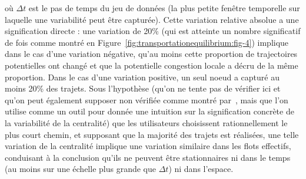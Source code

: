 {où $\Delta t$ est le pas de temps du jeu de données (la plus petite fenêtre temporelle sur laquelle une variabilité peut être capturée). Cette variation relative absolue a une signification directe : une variation de 20\% (qui est atteinte un nombre significatif de fois comme montré en Figure~\ref{fig:transportationequilibrium:fig-4}) implique dans le cas d'une variation négative, qu'au moins cette proportion de trajectoires potentielles ont changé et que la potentielle congestion locale a décru de la même proportion. Dans le cas d'une variation positive, un seul noeud a capturé au moins 20\% des trajets. Sous l'hypothèse (qu'on ne tente pas de vérifier ici et qu'on peut également supposer non vérifiée comme montré par~\cite{zhu2010people}, mais que l'on utilise comme un outil pour donnée une intuition sur la signification concrète de la variabilité de la centralité) que les utilisateurs choisissent rationnellement le plus court chemin, et supposant que la majorité des trajets est réalisées, une telle variation de la centralité implique une variation similaire dans les flots effectifs, conduisant à la conclusion qu'ils ne peuvent être stationnaires ni dans le temps (au moins sur une échelle plus grande que $\Delta t$) ni dans l'espace.
}




